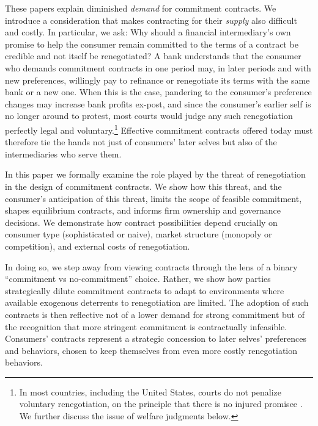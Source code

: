 \documentclass[11pt,english]{article}
\theoremstyle{plain}
\theoremstyle{definition}
\begin{document}
These papers explain diminished \textit{demand} for commitment contracts. We introduce a consideration that makes contracting for their \textit{supply} also difficult and costly. In particular, we ask: Why should a financial intermediary's own promise to help the consumer remain committed to the terms of a contract be credible and not itself be renegotiated? A bank understands that the consumer who demands commitment contracts in one period may, in later periods and with new preferences, willingly pay to refinance or renegotiate its terms \textendash{} with the same bank or a new one. When this is the case, pandering to the consumer's preference changes may increase bank profits ex-post, and since the consumer's earlier self is no longer around to protest, most courts would judge any such renegotiation perfectly legal and voluntary.\footnote{In most countries, including the United States, courts do not penalize voluntary renegotiation, on the principle that there is no injured promisee \citep[see discussion in][p448]{laibson1997}. We further discuss the issue of welfare judgments below.} Effective commitment contracts offered today must therefore tie the hands not just of consumers' later selves but also of the intermediaries who serve them.

In this paper we formally examine the role played by the threat of renegotiation in the design of commitment contracts. We show how this threat, and the consumer's anticipation of this threat, limits the scope of feasible commitment, shapes equilibrium contracts, and informs firm ownership and governance decisions. We demonstrate how contract possibilities depend crucially on consumer type (sophisticated or naive), market structure (monopoly or competition), and external costs of renegotiation.

In doing so, we step away from viewing contracts through the lens of a binary ``commitment vs no-commitment'' choice. Rather, we show how parties strategically dilute commitment contracts to adapt to environments where available exogenous deterrents to renegotiation are limited. The adoption of such contracts is then reflective not of a lower demand for strong commitment but of the recognition that more stringent commitment is contractually infeasible.
Consumers' contracts represent a strategic concession to later selves' preferences and behaviors, chosen to keep themselves from even more costly renegotiation behaviors.  
\end{document}
